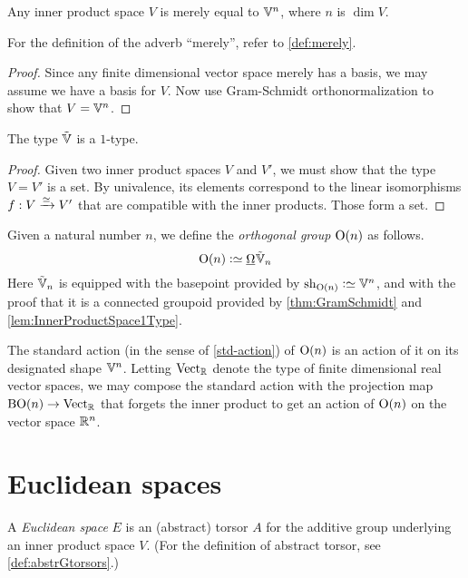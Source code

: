 \begin{theorem}\label{thm:GramSchmidt}
  Any inner product space $V$ is merely equal to $\mathbb V^n$, where $n$ is $\dim V$.
\end{theorem}

For the definition of the adverb ``merely'', refer to \cref{def:merely}.

\begin{proof}
  Since any finite dimensional vector space merely has a basis, we may assume
  we have a basis for $V$.  Now use Gram-Schmidt orthonormalization to show
  that $V = \mathbb V^n$.
\end{proof}

\begin{lemma}\label{lem:InnerProductSpace1Type}
  The type ${\tilde {\mathbb V}}$ is a $1$-type.
\end{lemma}

\begin{proof}
  Given two inner product spaces $V$ and $V'$, we must show that the type
  $V=V'$ is a set.  By univalence, its elements correspond to the linear
  isomorphisms $f : V \xrightarrow {\simeq} V'$ that are compatible with the
  inner products.  Those form a set.
\end{proof}

\begin{definition}\label{def:OrthogonalGroup}
  Given a natural number $n$, we define the {\em orthogonal group} $\mathrm{O}(n)$
  as follows.
  $$\OrthGp n \defeq \mkgroup \OS_n$$
  Here ${\tilde {\mathbb V}}_n$ is equipped with the basepoint provided by $\sh_{\OrthGp n} \defeq \VV^n$, and with the
  proof that it is a connected groupoid provided by \cref{thm:GramSchmidt} and
  \cref{lem:InnerProductSpace1Type}.
\end{definition}

The standard action (in the sense of \cref{std-action}) of $\mathrm{O}(n)$ is an
action of it on its designated shape $\mathbb V^n$.  Letting $\mathrm{Vect}_{\mathbb{R}}$ denote
the type of finite dimensional real vector spaces, we may compose the standard
action with the projection map $\mathrm{B} \mathrm{O}(n) \to \mathrm{Vect}_{\mathbb{R}}$ that
forgets the inner product to get an action of $\mathrm{O}(n)$ on the vector space
$\mathbb{R}^n$.
  
\section{Euclidean spaces}

\begin{definition}\label{def:EuclideanSpace}
  A {\em Euclidean space} $E$ is an (abstract) torsor $A$ for the additive group
  underlying an inner product space $V$.  (For the definition of abstract
  torsor, see \cref{def:abstrGtorsors}.)
\end{definition}

